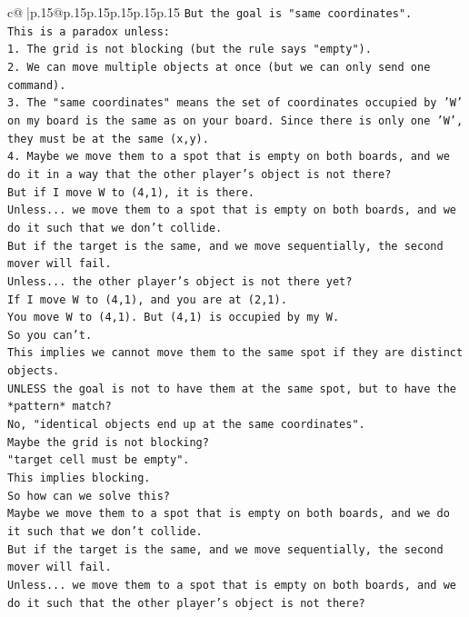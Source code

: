 \documentclass{article}
\begin{document}
{\begin{supertabular}{c@{$\;$}|p{.15\linewidth}@{}p{.15\linewidth}p{.15\linewidth}p{.15\linewidth}p{.15\linewidth}p{.15\linewidth}}
{{{\texttt{But the goal is "same coordinates".} \\
\texttt{This is a paradox unless:} \\
\texttt{1. The grid is not blocking (but the rule says "empty").} \\
\texttt{2. We can move multiple objects at once (but we can only send one command).} \\
\texttt{3. The "same coordinates" means the set of coordinates occupied by 'W' on my board is the same as on your board. Since there is only one 'W', they must be at the same (x,y).} \\
\texttt{4. Maybe we move them to a spot that is empty on both boards, and we do it in a way that the other player's object is not there?} \\
\texttt{But if I move W to (4,1), it is there.} \\
\texttt{Unless... we move them to a spot that is empty on both boards, and we do it such that we don't collide.} \\
\texttt{But if the target is the same, and we move sequentially, the second mover will fail.} \\
\texttt{Unless... the other player's object is not there yet?} \\
\texttt{If I move W to (4,1), and you are at (2,1).} \\
\texttt{You move W to (4,1). But (4,1) is occupied by my W.} \\
\texttt{So you can't.} \\
\texttt{This implies we cannot move them to the same spot if they are distinct objects.} \\
\texttt{UNLESS the goal is not to have them at the same spot, but to have the *pattern* match?} \\
\texttt{No, "identical objects end up at the same coordinates".} \\
\texttt{Maybe the grid is not blocking?} \\
\texttt{"target cell must be empty".} \\
\texttt{This implies blocking.} \\
\texttt{So how can we solve this?} \\
\texttt{Maybe we move them to a spot that is empty on both boards, and we do it such that we don't collide.} \\
\texttt{But if the target is the same, and we move sequentially, the second mover will fail.} \\
\texttt{Unless... we move them to a spot that is empty on both boards, and we do it such that the other player's object is not there?} \\
}}}
\end{supertabular}}
\end{document}
